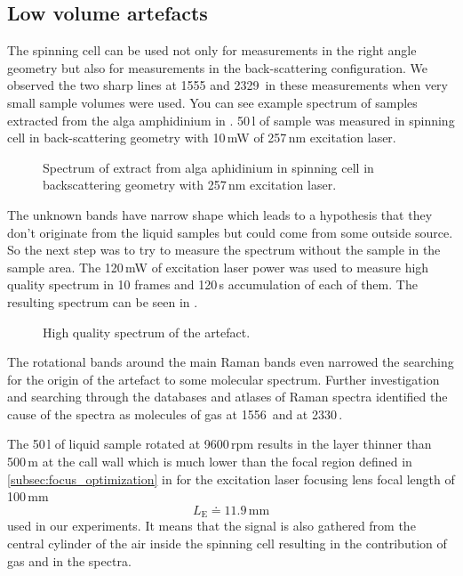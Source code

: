 \subsection{Low volume artefacts}

The spinning cell can be used not only for measurements in the right angle
geometry but also for measurements in the back-scattering configuration.
We observed the two sharp lines at 1555 and 2329\,\icm{} in these measurements
when very small sample volumes were used.
You can see example spectrum of samples extracted from the alga amphidinium in
.
50\,l of sample was measured in spinning cell in back-scattering geometry
with 10\,mW of 257\,nm excitation laser.

\begin{figure}
	\centering
	
	\caption{Spectrum of extract from alga aphidinium in spinning cell in
		backscattering geometry with 257\,nm excitation laser.}
	\label{\figlabel{artefact:artefact_amphidinium}}
\end{figure}

The unknown bands have narrow shape which leads to a hypothesis that they
don't originate from the liquid samples but could come from some outside
source. So the next step was to try to measure the spectrum without the
sample in the sample area. The 120\,mW of excitation laser power was used to
measure high quality spectrum in 10 frames and 120\,s accumulation of each of
them. The resulting spectrum can be seen in
.

\begin{figure}
	\centering
	
	\caption{High quality spectrum of the artefact.}
	\label{\figlabel{artefact:artefact}}
\end{figure}

The rotational bands around the main Raman bands even narrowed the searching
for the origin of the artefact to some molecular spectrum. Further
investigation and searching through the databases and atlases of Raman spectra
identified the cause of the spectra as molecules of gas  at 1556\,\icm{}
and  at 2330\,\icm{}.

The 50\,l of liquid sample rotated at 9600\,rpm results in the layer
thinner than 500\,m at the call wall which is much lower than the focal
region defined in
\cref{subsec:focus_optimization}
in
for the excitation laser focusing lens focal length of 100\,mm
\begin{equation*}
L_\text{E} \doteq 11.9\,\text{mm}
\end{equation*}
used in our experiments.
It means that the signal is also gathered from the central cylinder of the air
inside the spinning cell resulting in the contribution of gas  and
 in the spectra.
